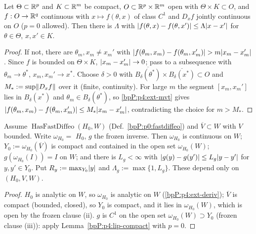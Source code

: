 \begin{lemma}\label{bpP:p4:lip-compact}
Let $\Theta\subset\mathbb{R}^p$ and $K\subset\mathbb{R}^m$ be compact, $O\subset\mathbb{R}^p\times\mathbb{R}^m$ open with $\Theta\times K\subset O$, and $f:O\to\mathbb{R}^q$ continuous with $x\mapsto f(\theta,x)$ of class $C^1$ and $D_xf$ jointly continuous on $O$ ($p=0$ allowed). Then there is $\Lambda$ with $\lvert f(\theta,x)-f(\theta,x')\rvert\le\Lambda\lvert x-x'\rvert$ for $\theta\in\Theta$, $x,x'\in K$.
\end{lemma}
\begin{proof}
\label{stepP:p4:lc-contra}
If not, there are $\theta_m,x_m\ne x_m'$ with $\lvert f(\theta_m,x_m)-f(\theta_m,x_m')\rvert>m\lvert x_m-x_m'\rvert$. Since $f$ is bounded on $\Theta\times K$, $\lvert x_m-x_m'\rvert\to0$; pass to a subsequence with $\theta_m\to\theta^*$, $x_m,x_m'\to x^*$.
\label{stepP:p4:lc-local}
Choose $\delta>0$ with $\overline{B_\delta(\theta^*)}\times\overline{B_\delta(x^*)}\subset O$ and $M_*:=\sup\lVert D_xf\rVert$ over it (finite, continuity). For large $m$ the segment $[x_m,x_m']$ lies in $B_\delta(x^*)$ and $\theta_m\in B_\delta(\theta^*)$, so \ref{bpP:p4:ext-mvt} gives $\lvert f(\theta_m,x_m)-f(\theta_m,x_m')\rvert\le M_*\lvert x_m-x_m'\rvert$, contradicting the choice for $m>M_*$.
\end{proof}

\begin{lemma}\label{bpP:p4:lip-inverse}
Assume $\operatorname{HasFastDiffeo}(H_0,W)$ (Def.~\ref{bpP:p0:fastdiffeo}) and $\overline V\subset W$ with $V$ bounded. Write $\omega_{H_0}=$  $H_0$, $g$ the frozen inverse. Then $\omega_{H_0}$ is continuous on $W$; $Y_0:=\omega_{H_0}(\overline V)$ is compact and contained in the open set $\omega_{H_0}(W)$; $g(\omega_{H_0}(I))=I$ on $W$; and there is $L_g<\infty$ with $\lvert g(y)-g(y')\rvert\le L_g\lvert y-y'\rvert$ for $y,y'\in Y_0$. Put $R_y:=\max_{Y_0}\lvert y\rvert$ and $\Lambda_g:=\max\{1,L_g\}$. These depend only on $(H_0,V,W)$.
\end{lemma}
\begin{proof}
\label{stepP:p4:li-cont}
$H_0$ is analytic on $W$, so $\omega_{H_0}$ is analytic on $W$ (\ref{bpP:p4:ext-deriv}); $\overline V$ is compact (bounded, closed), so $Y_0$ is compact, and it lies in $\omega_{H_0}(W)$, which is open by the frozen clause (ii).
\label{stepP:p4:li-lip}
$g$ is $C^1$ on the open set $\omega_{H_0}(W)\supset Y_0$ (frozen clause (iii)): apply Lemma~\ref{bpP:p4:lip-compact} with $p=0$.
\end{proof}

